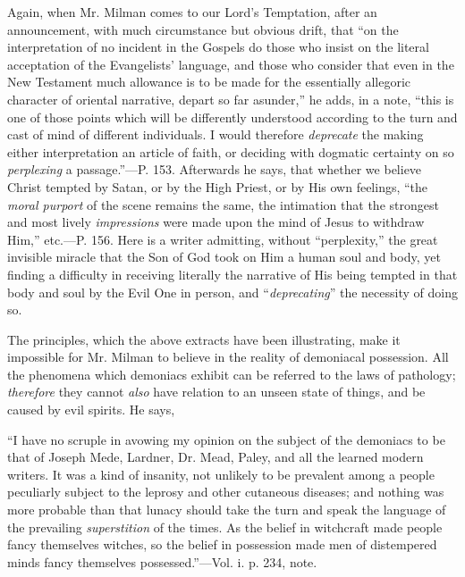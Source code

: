 Again, when Mr. Milman comes to our Lord's
Temptation, after an announcement, with much circumstance but obvious
drift, that ``on the interpretation of no incident in the Gospels do
those who insist on the literal acceptation of the Evangelists'
language, and those who consider that even in the New Testament much
allowance is to be made for the essentially allegoric character of
oriental narrative, depart so far asunder,'' he adds, in a note, ``this
is one of those points which will be differently understood according
to the turn and cast of mind of different individuals. I would
therefore \emph{deprecate} the making either interpretation an article
of faith, or deciding with dogmatic certainty on so \emph{perplexing}
a passage.''—P. 153. Afterwards he says, that whether we believe
Christ tempted by Satan, or by the High Priest, or by His own
feelings, ``the \emph{moral purport} of the scene remains the same, the
intimation that the strongest and most lively \emph{impressions} were
made upon the mind of Jesus to withdraw Him,'' etc.—P. 156. Here is a
writer admitting, without ``perplexity,'' the great invisible miracle
that the Son of God took on Him a human soul and body, yet finding a
difficulty in receiving literally the narrative of His being tempted
in that body and soul by the Evil One in person, and ``\emph{deprecating}''
the necessity of doing so.

The principles, which the above extracts have
been illustrating, make it impossible for Mr. Milman to believe in the
reality of demoniacal possession. All the phenomena which demoniacs
exhibit can be referred to the laws of pathology; \emph{therefore}
they cannot \emph{also} have relation to an unseen state of things,
and be caused by evil spirits. He says,

``I
have no scruple in avowing my opinion on the subject of the demoniacs
to be that of Joseph Mede, Lardner, Dr. Mead, Paley, and all the
learned modern writers. It was a kind of insanity, not unlikely to be
prevalent among a people peculiarly subject to the leprosy and other
cutaneous diseases; and nothing was more probable than that lunacy
should take the turn and speak the language of the prevailing \emph{superstition}
of the times. As the belief in witchcraft made people fancy themselves
witches, so the belief in possession made men of distempered minds
fancy themselves possessed.''—Vol. i. p. 234, note.

